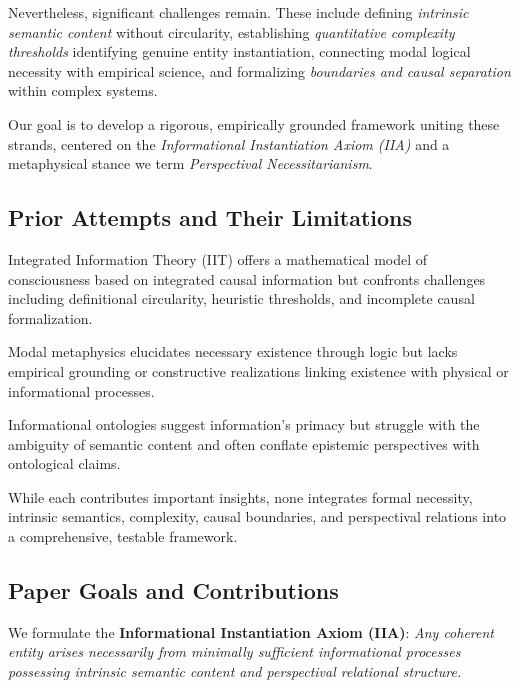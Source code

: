 \documentclass[12pt,a4paper]{article}
\begin{document}
Nevertheless, significant challenges remain. These include defining \emph{intrinsic semantic content} without circularity, establishing \emph{quantitative complexity thresholds} identifying genuine entity instantiation, connecting modal logical necessity with empirical science, and formalizing \emph{boundaries and causal separation} within complex systems.

Our goal is to develop a rigorous, empirically grounded framework uniting these strands, centered on the \emph{Informational Instantiation Axiom (IIA)} and a metaphysical stance we term \emph{Perspectival Necessitarianism}.

\subsection{Prior Attempts and Their Limitations}  
Integrated Information Theory (IIT) offers a mathematical model of consciousness based on integrated causal information but confronts challenges including definitional circularity, heuristic thresholds, and incomplete causal formalization.

Modal metaphysics elucidates necessary existence through logic but lacks empirical grounding or constructive realizations linking existence with physical or informational processes.

Informational ontologies suggest information’s primacy but struggle with the ambiguity of semantic content and often conflate epistemic perspectives with ontological claims.

While each contributes important insights, none integrates formal necessity, intrinsic semantics, complexity, causal boundaries, and perspectival relations into a comprehensive, testable framework.

\subsection{Paper Goals and Contributions}  
We formulate the \textbf{Informational Instantiation Axiom (IIA)}: \emph{Any coherent entity arises necessarily from minimally sufficient informational processes possessing intrinsic semantic content and perspectival relational structure.}
\end{document}

